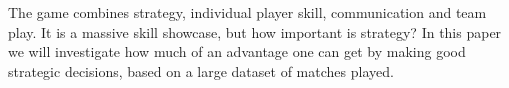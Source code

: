 The game combines strategy, individual player skill, communication and team play. It is a massive skill showcase, but how important is strategy? In this paper we will investigate how much of an advantage one can get by making good strategic decisions, based on a large dataset of matches played.


